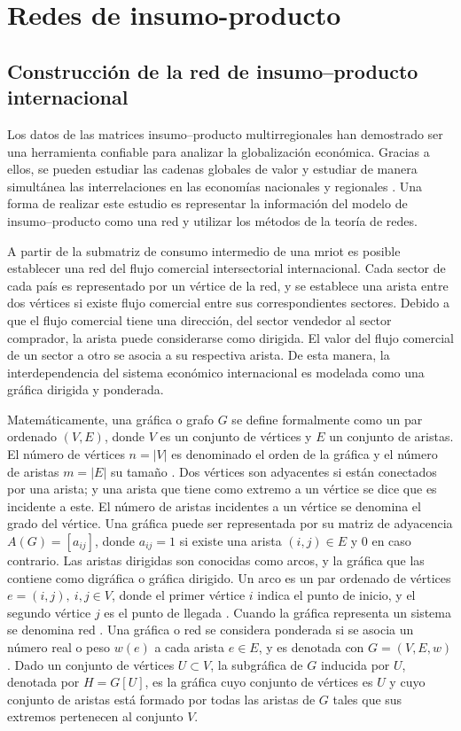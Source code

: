 \chapter{Redes de insumo-producto}

\section{Construcción de la red de insumo--producto internacional}

Los datos de las matrices insumo--producto multirregionales han demostrado ser una herramienta confiable para analizar la globalización económica. Gracias a ellos, se pueden estudiar las cadenas globales de valor y estudiar de manera simultánea las interrelaciones en las economías nacionales y regionales \parencite[p.~18]{Xing2022}. Una forma de realizar este estudio es representar la información del modelo de insumo--producto como una red y utilizar los métodos de la teoría de redes. 

A partir de la submatriz de consumo intermedio de una \acrfull{mriot} es posible establecer una red del flujo comercial intersectorial internacional. Cada sector de cada país  es representado por un vértice de la red, y se establece una arista entre dos vértices si existe flujo comercial entre sus correspondientes sectores. Debido a que el flujo comercial tiene una dirección, del sector vendedor al sector comprador, la arista puede considerarse como dirigida. El valor del flujo comercial de un sector a otro se asocia a su respectiva arista. De esta manera, la interdependencia del sistema económico internacional es modelada como una gráfica dirigida y ponderada.

Matemáticamente, una gráfica o grafo $G$ se define formalmente como un par ordenado $(V,E)$, donde $V$ es un conjunto de vértices y $E$ un conjunto de aristas. El número de vértices $n=|V|$ es denominado el orden de la gráfica y el número de aristas $m=|E|$ su tamaño \parencite[p.~2]{Bondy2008}. Dos vértices son adyacentes si están conectados por una arista; y una arista que tiene como extremo a un vértice se dice que es incidente a este. El número de aristas incidentes a un vértice se denomina el grado del vértice. Una gráfica puede ser representada por su matriz de adyacencia $A(G) = [a_{ij}]$, donde $a_{ij}=1$ si existe una arista $(i,j)\in E$ y $0$ en caso contrario. Las aristas dirigidas son conocidas como arcos, y la gráfica que las contiene como digráfica o gráfica dirigido. Un arco es un par ordenado de vértices $e=(i,j), \ i,j\in V$, donde el primer vértice $i$ indica el punto de inicio, y el segundo vértice $j$ es el punto de llegada \parencite[p.~31] {Bondy2008}. Cuando la gráfica representa un sistema se denomina red \parencite[p.~7]{Estrada2012}. Una gráfica o red se considera ponderada si se asocia un número real o peso $w(e)$ a cada arista $e\in E$, y es denotada con $G=(V,E,w)$ \parencite[p.~50]{Bondy2008}. Dado un conjunto de vértices $U\subset V$, la subgráfica de $G$ inducida por $U$, denotada por $H=G[U]$, es la gráfica cuyo conjunto de vértices es $U$ y cuyo conjunto de aristas está formado por todas las aristas de $G$ tales que sus extremos pertenecen al conjunto $V$.

